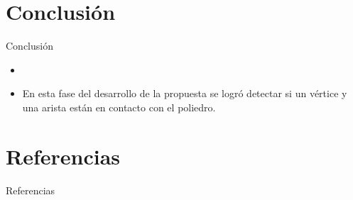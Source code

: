 \documentclass[11pt]{beamer}
\begin{document}
\section{Conclusi\'on}
\begin{frame}{Conclusión}
 \begin{itemize}
  \item 
  \item En esta fase del desarrollo de la propuesta se logr\'o detectar si un vértice y una arista están en contacto con el poliedro.
 \end{itemize}
\end{frame}

\section{Referencias}
\begin{frame}{Referencias}
\medskip


\end{frame}


\begin{frame}[plain]
  \titlepage
\end{frame}
\end{document}
